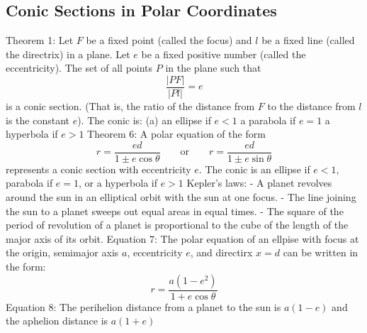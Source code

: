\documentclass{article}
\begin{document}
    \subsection{Conic Sections in Polar Coordinates}
    \begin{outline}
        \1 Theorem 1: Let $F$ be a fixed point (called the focus) and $l$ be a fixed line (called the directrix) in a plane. Let $e$ be a fixed positive number (called the eccentricity). The set of all points $P$ in the plane such that \[\dfrac{|PF|}{|Pl|}=e\] is a conic section. (That is, the ratio of the distance from $F$ to the distance from $l$ is the constant $e$). The conic is: 
            \2 (a) an ellipse if \(e<1\)
            \2 a parabola if \(e=1\)
            \2 a hyperbola if \(e>1\)
        \1 Theorem 6: A polar equation of the form \[r=\dfrac{ed}{1\pm e\cos\theta}\qquad\text{or}\qquad r=\dfrac{ed}{1\pm e\sin\theta}\] represents a conic section with eccentricity $e$. The conic is an ellipse if \(e<1\), parabola if \(e=1\), or a hyperbola if \(e>1\)
        \1 Kepler's laws: 
             - A planet revolves around the sun in an elliptical orbit with the sun at one focus. 
             - The line joining the sun to a planet sweeps out equal areas in equal times. 
             - The square of the period of revolution of a planet is proportional to the cube of the length of the major axis of its orbit. 
        \1 Equation 7: The polar equation of an ellpise with focus at the origin, semimajor axis $a$, eccentricity $e$, and directirx \(x=d\) can be written in the form: \[r=\dfrac{a(1-e^2)}{1+e\cos\theta}\]
        \1 Equation 8: The perihelion distance from a planet to the sun is \(a(1-e)\) and the aphelion distance is \(a(1+e)\)
    \end{outline}
\end{document}

